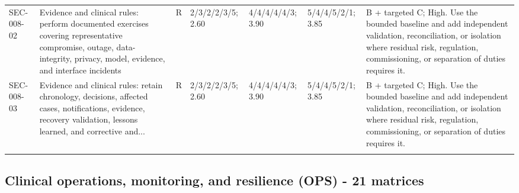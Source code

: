 \documentclass[11pt,letterpaper]{article}
\begin{document}
\begin{scriptsize}
\begin{longtable}{@{}L{0.11\textwidth}L{0.165\textwidth}L{0.04\textwidth}L{0.115\textwidth}L{0.115\textwidth}L{0.115\textwidth}L{0.235\textwidth}@{}}
\addlinespace[2pt]
SEC-008-02 & Evidence and clinical rules: perform documented exercises covering representative compromise, outage, data-integrity, privacy, model, evidence, and interface incidents & R & 2/3/2/2/3/5; 2.60 & 4/4/4/4/4/3; 3.90 & 5/4/4/5/2/1; 3.85 & B + targeted C; High. Use the bounded baseline and add independent validation, reconciliation, or isolation where residual risk, regulation, commissioning, or separation of duties requires it. \\
\addlinespace[2pt]
SEC-008-03 & Evidence and clinical rules: retain chronology, decisions, affected cases, notifications, evidence, recovery validation, lessons learned, and corrective and... & R & 2/3/2/2/3/5; 2.60 & 4/4/4/4/4/3; 3.90 & 5/4/4/5/2/1; 3.85 & B + targeted C; High. Use the bounded baseline and add independent validation, reconciliation, or isolation where residual risk, regulation, commissioning, or separation of duties requires it. \\
\addlinespace[2pt]
\end{longtable}
\end{scriptsize}

\subsection{Clinical operations, monitoring, and resilience (OPS) - 21 matrices}
\end{document}

